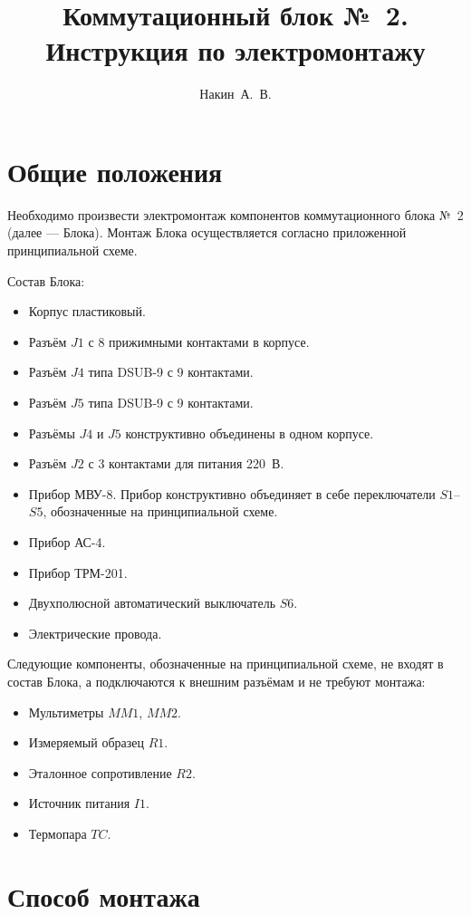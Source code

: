 \documentclass[12pt, a4paper]{article}
\title{Коммутационный блок №~2. \\ Инструкция по электромонтажу}
\author{Накин~А.~В.}
\begin{document}
\maketitle

\section{Общие положения}

Необходимо произвести электромонтаж компонентов коммутационного блока №~2 (далее --- Блока). Монтаж Блока осуществляется согласно приложенной принципиальной схеме.

Состав Блока:

\begin{itemize}
\item Корпус пластиковый.
\item Разъём $J1$ с 8 прижимными контактами в корпусе.
\item Разъём $J4$ типа DSUB-9 с 9 контактами.
\item Разъём $J5$ типа DSUB-9 с 9 контактами.
\item Разъёмы $J4$ и $J5$ конструктивно объединены в одном корпусе.
\item Разъём $J2$ с 3 контактами для питания 220~В.
\item Прибор МВУ-8. Прибор конструктивно объединяет в себе переключатели $S1$--$S5$, обозначенные на принципиальной схеме.
\item Прибор АС-4.
\item Прибор ТРМ-201.
\item Двухполюсной автоматический выключатель $S6$.
\item Электрические провода.
\end{itemize}

Следующие компоненты, обозначенные на принципиальной схеме, не входят в состав Блока, а подключаются к внешним разъёмам и не требуют монтажа:

\begin{itemize}
\item Мультиметры $MM1$, $MM2$.
\item Измеряемый образец $R1$.
\item Эталонное сопротивление $R2$.
\item Источник питания $I1$.
\item Термопара $TC$.
\end{itemize}


\section{Способ монтажа}
\label{sec_wires}
\end{document}
